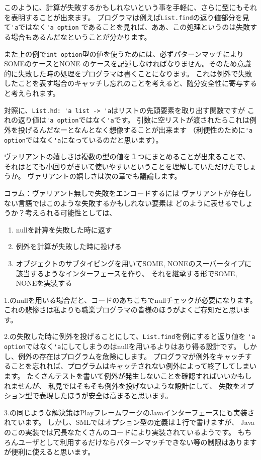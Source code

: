 \documentclass[11pt,a4paper]{article}
\begin{document}
このように、計算が失敗するかもしれないという事を手軽に、さらに型にもそれを表明することが出来ます。
プログラマは例えば\lstinline{List.find}の返り値部分を見て\lstinline{'a}ではなく\lstinline{'a option}
であることを見れば、ああ、この処理というのは失敗する場合もあるんだなということが分かります。

また上の例で\lstinline{int option}型の値を使うためには、必ずパターンマッチによりSOMEのケースとNONE
のケースを記述しなければなりません。そのため意識的に失敗した時の処理をプログラマは書くことになります。
これは例外で失敗したことを表す場合のキャッチし忘れのことを考えると、随分安全性に寄与すると考えられます。

対照に、\lstinline{List.hd: 'a list -> 'a}はリストの先頭要素を取り出す関数ですが
これの返り値は\lstinline{'a option}ではなく\lstinline{'a}です。
引数に空リストが渡されたらこれは例外を投げるんだなーとなんとなく想像することが出来ます
（利便性のために\lstinline{'a option}ではなく\lstinline{'a}になっているのだと思います）。

ヴァリアントの嬉しさは複数の型の値を１つにまとめることが出来ることで、
それはとても小回りがきいて使いやすいということを理解していただけたでしょうか。
ヴァリアントの嬉しさは次の章でも議論します。

\begin{itembox}[l]{コラム：ヴァリアント無しで失敗をエンコードするには}
ヴァリアントが存在しない言語ではこのような失敗するかもしれない要素は
どのように表せるでしょうか？考えられる可能性としては、
\begin{enumerate}
\item nullを計算を失敗した時に返す
\item 例外を計算が失敗した時に投げる
\item オブジェクトのサブタイピングを用いてSOME, NONEのスーパータイプに該当するようなインターフェースを作り、
  それを継承する形でSOME, NONEを実装する
\end{enumerate}

1.のnullを用いる場合だと、コードのあちこちでnullチェックが必要になります。
これの悲惨さは私よりも職業プログラマの皆様のほうがよくご存知だと思います。

2.の失敗した時に例外を投げることにして、\lstinline{List.find}を例にすると返り値を
\lstinline{'a option}ではなく\lstinline{'a}にしてしまうのはnullを用いるよりはあり得る設計です。
しかし、例外の存在はプログラムを危険にします。
プログラマが例外をキャッチすることを忘れれば、プログラムはキャッチされない例外によって終了してしまいます。
たくさんテストを書いて例外が発生しないことを確認すればいいかもしれませんが、
私見ではそもそも例外を投げないような設計にして、
失敗をオプション型で表現したほうが安全は高まると思います。

3.の同じような解決策はPlayフレームワーク\cite{play}のJavaインターフェースにも実装されています。
しかし、SMLではオプション型の定義は１行で書けますが、
Javaのこの実装では冗長なたくさんのコードにより実装されているようです\cite{play-doc-option}。
もちろんユーザとして利用するだけならパターンマッチできない等の制限はありますが便利に使えると思います。
\end{itembox}
\end{document}
